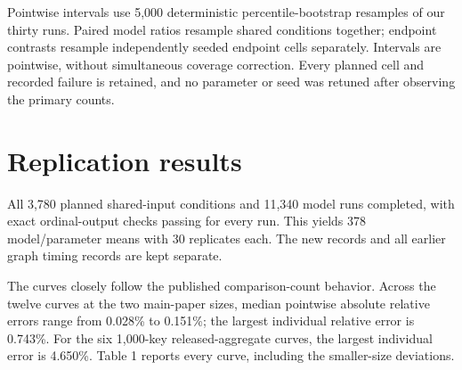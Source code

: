 Pointwise intervals use 5,000 deterministic percentile-bootstrap resamples of our thirty runs. Paired model ratios resample shared conditions together; endpoint contrasts resample independently seeded endpoint cells separately. Intervals are pointwise, without simultaneous coverage correction. Every planned cell and recorded failure is retained, and no parameter or seed was retuned after observing the primary counts.

\section{Replication results}
All 3,780 planned shared-input conditions and 11,340 model runs completed, with exact ordinal-output checks passing for every run. This yields 378 model/parameter means with 30 replicates each. The new records and all earlier graph timing records are kept separate.

The curves closely follow the published comparison-count behavior. Across the twelve curves at the two main-paper sizes, median pointwise absolute relative errors range from 0.028\% to 0.151\%; the largest individual relative error is 0.743\%. For the six 1,000-key released-aggregate curves, the largest individual error is 4.650\%. Table 1 reports every curve, including the smaller-size deviations.

